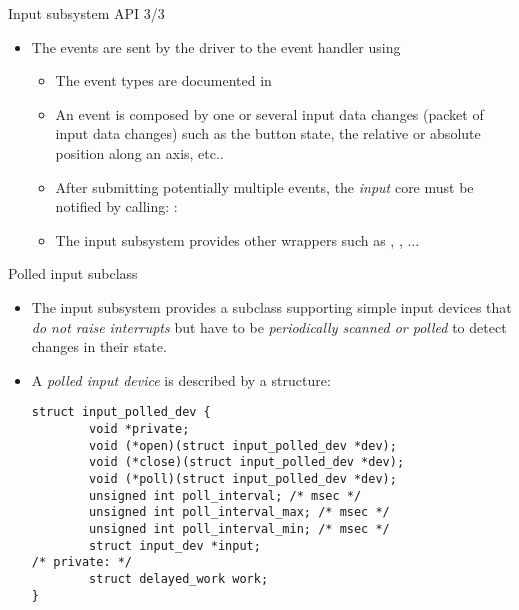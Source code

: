 \begin{frame}[fragile]{Input subsystem API 3/3}
  \begin{itemize}
  \item The events are sent by the driver to the event handler using
    \begin{itemize}
    \item The event types are documented in 
    \item An event is composed by one or several input data changes
      (packet of input data changes) such as the button state, the
      relative or absolute position along an axis, etc..
    \item After submitting potentially multiple events, the {\em
        input} core must be notified by calling:
      :
    \item The input subsystem provides other wrappers such as
      , , ...
    \end{itemize}
  \end{itemize}
\end{frame}

\begin{frame}[fragile]{Polled input subclass}
  \begin{itemize}
  \item The input subsystem provides a subclass supporting simple input
    devices that {\em do not raise interrupts} but have to be {\em
      periodically scanned or polled} to detect changes in their
    state.
  \item A {\em polled input device} is described by a
     structure:
    \begin{block}{}
    \begin{verbatim}
struct input_polled_dev {
        void *private;
        void (*open)(struct input_polled_dev *dev);
        void (*close)(struct input_polled_dev *dev);
        void (*poll)(struct input_polled_dev *dev);
        unsigned int poll_interval; /* msec */
        unsigned int poll_interval_max; /* msec */
        unsigned int poll_interval_min; /* msec */
        struct input_dev *input;
/* private: */
        struct delayed_work work;
}
    \end{verbatim}
    \end{block}
  \end{itemize}
\end{frame}

